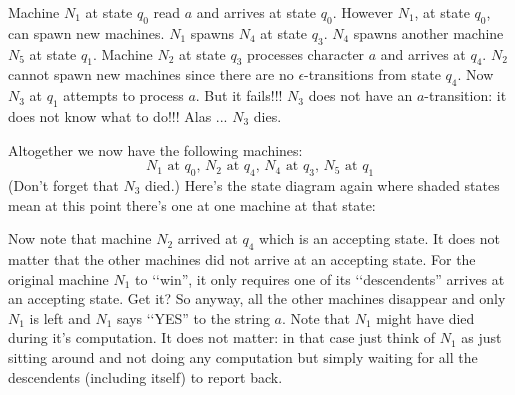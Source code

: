 \begin{enumerate}
\li Machine $N_1$ at state $q_0$ read $a$ and arrives at state $q_0$. 
However $N_1$, at state $q_0$, can spawn new machines. 
$N_1$ spawns $N_4$ at state $q_3$. $N_4$ spawns another machine $N_5$ at state $q_1$.
\li Machine $N_2$ at state $q_3$ processes character $a$ and arrives at $q_4$. 
$N_2$ cannot spawn new machines since there are no 
$\epsilon$-transitions from state $q_4$.
\li Now $N_3$ at $q_1$ attempts to process $a$. 
But it fails!!!  $N_3$ does not have an $a$-transition: 
it does not know what to do!!! Alas ... $N_3$ dies.
\end{enumerate}
Altogether we now have the following machines:
\[
	\text{$N_1$ at $q_0$, $N_2$ at $q_4$, $N_4$ at $q_3$, $N_5$ at $q_1$}
\]
(Don't forget that $N_3$ died.)
Here's the state diagram again where shaded states mean
at this point there's one at one machine at that state:
\begin{center}
\end{center}

Now note that machine $N_2$ arrived at $q_4$ 
which is an accepting state. 
It does not matter that the other machines did not arrive at an 
accepting state. 
For the original machine $N_1$ to \lq\lq win'', 
it only requires one of its \lq\lq descendents'' 
arrives at an accepting state. 
Get it? So anyway,
all the other machines disappear and only $N_1$ is left and 
$N_1$ says \lq\lq YES'' to the string $a$.
Note that $N_1$ might have died during it's computation.
It does not matter: in that case just think of $N_1$ as just sitting
around and not doing any computation but simply waiting for
all the descendents (including itself) to report back.

